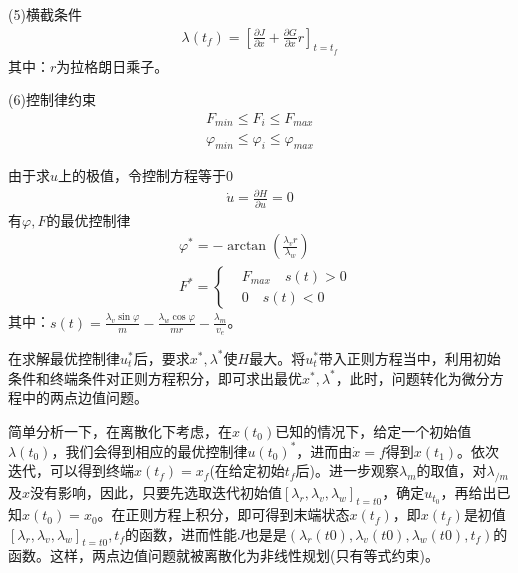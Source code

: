             \par
            (5)横截条件
            \begin{align*}
            \lambda(t_f) = \left[\frac{\partial J}{\partial x}+\frac{\partial G}{\partial x}r  \right]_{t = t_f}
            \end{align*}
            其中：$r$为拉格朗日乘子。
            \par
            (6)控制律约束
            \begin{align*}
            F_{min} \leqslant F_i \leqslant F_{max}\\
            \varphi_{min} \leqslant \varphi_i \leqslant \varphi_{max}
            \end{align*}
            \par
            由于求$u$上的极值，令控制方程等于0
            \begin{align*}
            \dot{u} = \frac{\partial H}{\partial u}=0
            \end{align*}
            有$\varphi,F$的最优控制律
            \begin{align*}
            & \varphi^* = -\arctan \left( \frac{\lambda_v r}{\lambda_w} \right) \\
            & F^* = \left\{
            \begin{aligned}
            & F_{max} \quad s(t) >0\\
            & 0\quad s(t)<0
            \end{aligned}
            \right.
            \end{align*}
            其中：$s(t)=\frac{\lambda_v \sin \varphi}{m} - \frac{\lambda_w \cos\varphi}{mr} - \frac{\lambda_m}{v_e} $。
            \par
            在求解最优控制律$u_t^*$后，要求$x^*,\lambda^*$使$H$最大。将$u_t^*$带入正则方程当中，利用初始条件和终端条件对正则方程积分，即可求出最优$x^*,\lambda^*$，此时，问题转化为微分方程中的两点边值问题。
            \par
            简单分析一下，在离散化下考虑，在$x(t_0)$已知的情况下，给定一个初始值$\lambda(t_0)$，我们会得到相应的最优控制律$u(t_0)^*$，进而由$\dot{x} = f$得到$x(t_1)$。依次迭代，可以得到终端$x(t_f) = x_f$(在给定初始$t_f$后)。进一步观察$\lambda_m$的取值，对$\lambda_{/m}$及$x$没有影响，因此，只要先选取迭代初始值$[\lambda_r,\lambda_v,\lambda_w]_{t=t0}$，确定$u_{t_0}$，再给出已知$x(t_0) = x_0$。在正则方程上积分，即可得到末端状态$x(t_f)$，即$x(t_f)$是初值$[\lambda_r,\lambda_v,\lambda_w]_{t=t0},t_f$的函数，进而性能$J$也是是$(\lambda_r(t0),\lambda_v(t0),\lambda_w(t0),t_f)$的函数。这样，两点边值问题就被离散化为非线性规划(只有等式约束)。
